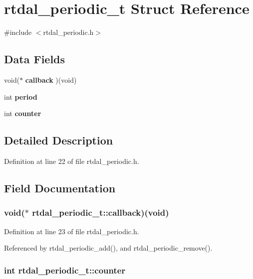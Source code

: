\section{rtdal\-\_\-periodic\-\_\-t Struct Reference}
\label{structrtdal__periodic__t}


{\ttfamily \#include $<$rtdal\-\_\-periodic.\-h$>$}

\subsection*{Data Fields}
\begin{DoxyCompactItemize}
\item 
void($\ast$ {\bf callback} )(void)
\item 
int {\bf period}
\item 
int {\bf counter}
\end{DoxyCompactItemize}


\subsection{Detailed Description}


Definition at line 22 of file rtdal\-\_\-periodic.\-h.



\subsection{Field Documentation}
\subsubsection[{callback}]{\setlength{\rightskip}{0pt plus 5cm}void($\ast$ rtdal\-\_\-periodic\-\_\-t\-::callback)(void)}\label{structrtdal__periodic__t_a34f3cfcdf838e3d06f9e4dbdc3875156}


Definition at line 23 of file rtdal\-\_\-periodic.\-h.



Referenced by rtdal\-\_\-periodic\-\_\-add(), and rtdal\-\_\-periodic\-\_\-remove().

\subsubsection[{counter}]{\setlength{\rightskip}{0pt plus 5cm}int rtdal\-\_\-periodic\-\_\-t\-::counter}\label{structrtdal__periodic__t_aab5ee7319833ace02d2d350cc3af9d28}



